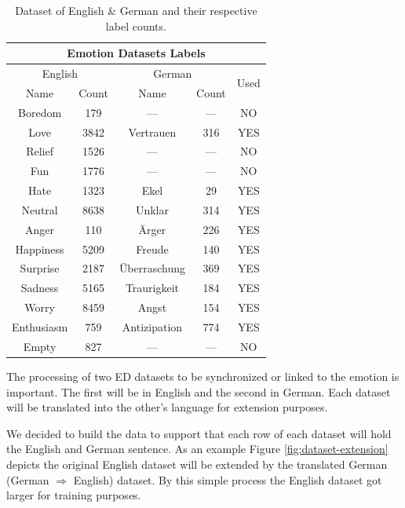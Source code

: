\documentclass[11pt]{article}
\begin{document}
\begin{table}[h!]
\centering
\begin{tabular}{ | c c | c c | c | }
    \hline
    \multicolumn{5}{|c|}{Emotion Datasets Labels} \\
    
    \hline
    \multicolumn{2}{|c|}{English} & \multicolumn{2}{c|}{German} & \multirow{2}{*}{Used} \\
    Name & Count & Name & Count \\
    \hline
    Boredom    &  179 & ---           & --- & NO  \\
    Love       & 3842 & Vertrauen     & 316 & YES \\
    Relief     & 1526 & ---           & --- & NO  \\ 
    Fun        & 1776 & ---           & --- & NO  \\
    Hate       & 1323 & Ekel          &  29 & YES \\
    Neutral    & 8638 & Unklar        & 314 & YES \\
    Anger      &  110 & Ärger         & 226 & YES \\
    Happiness  & 5209 & Freude        & 140 & YES \\
    Surprise   & 2187 & Überraschung  & 369 & YES \\
    Sadness    & 5165 & Traurigkeit   & 184 & YES \\
    Worry      & 8459 & Angst         & 154 & YES \\
    Enthusiasm &  759 & Antizipation  & 774 & YES \\
    Empty      &  827 & ---           & --- & NO  \\
    \hline
\end{tabular}
\caption{Dataset of English \& German and their respective label counts.}
\label{table:dataset_labels}
\end{table}

The processing of two ED datasets to be synchronized or linked to the emotion is important. The first will be in English and the second in German. Each dataset will be translated into the other's language for extension purposes. 

We decided to build the data to support that each row of each dataset will hold the English and German sentence. As an example Figure \ref{fig:dataset-extension} depicts the original English dataset will be extended by the translated German (German $\Rightarrow$ English) dataset. By this simple process the English dataset got larger for training purposes.
\end{document}
